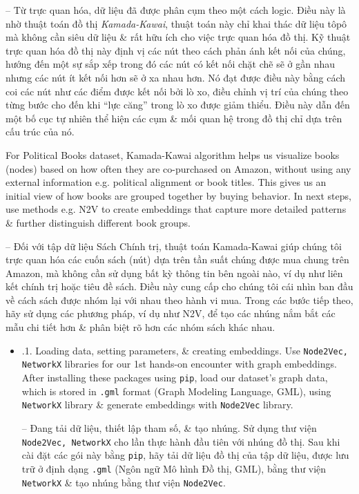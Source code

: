 \documentclass{article}
\begin{document}
\begin{itemize}
\begin{itemize}
        -- Từ trực quan hóa, dữ liệu đã được phân cụm theo một cách logic. Điều này là nhờ thuật toán đồ thị {\it Kamada-Kawai}, thuật toán này chỉ khai thác dữ liệu tôpô mà không cần siêu dữ liệu \& rất hữu ích cho việc trực quan hóa đồ thị. Kỹ thuật trực quan hóa đồ thị này định vị các nút theo cách phản ánh kết nối của chúng, hướng đến một sự sắp xếp trong đó các nút có kết nối chặt chẽ sẽ ở gần nhau nhưng các nút ít kết nối hơn sẽ ở xa nhau hơn. Nó đạt được điều này bằng cách coi các nút như các điểm được kết nối bởi lò xo, điều chỉnh vị trí của chúng theo từng bước cho đến khi ``lực căng'' trong lò xo được giảm thiểu. Điều này dẫn đến một bố cục tự nhiên thể hiện các cụm \& mối quan hệ trong đồ thị chỉ dựa trên cấu trúc của nó.

        For Political Books dataset, Kamada-Kawai algorithm helps us visualize books (nodes) based on how often they are co-purchased on Amazon, without using any external information e.g. political alignment or book titles. This gives us an initial view of how books are grouped together by buying behavior. In next steps, use methods e.g. N2V to create embeddings that capture more detailed patterns \& further distinguish different book groups.

        -- Đối với tập dữ liệu Sách Chính trị, thuật toán Kamada-Kawai giúp chúng tôi trực quan hóa các cuốn sách (nút) dựa trên tần suất chúng được mua chung trên Amazon, mà không cần sử dụng bất kỳ thông tin bên ngoài nào, ví dụ như liên kết chính trị hoặc tiêu đề sách. Điều này cung cấp cho chúng tôi cái nhìn ban đầu về cách sách được nhóm lại với nhau theo hành vi mua. Trong các bước tiếp theo, hãy sử dụng các phương pháp, ví dụ như N2V, để tạo các nhúng nắm bắt các mẫu chi tiết hơn \& phân biệt rõ hơn các nhóm sách khác nhau.
       \begin{itemize}
           \item {.1. Loading data, setting parameters, \& creating embeddings.} Use {\tt Node2Vec, NetworkX} libraries for our 1st hands-on encounter with graph embeddings. After installing these packages using {\tt pip}, load our dataset's graph data, which is stored in {\tt.gml} format (Graph Modeling Language, GML), using {\tt NetworkX} library \& generate embeddings with {\tt Node2Vec} library.

           -- {\sf Đang tải dữ liệu, thiết lập tham số, \& tạo nhúng.} Sử dụng thư viện {\tt Node2Vec, NetworkX} cho lần thực hành đầu tiên với nhúng đồ thị. Sau khi cài đặt các gói này bằng {\tt pip}, hãy tải dữ liệu đồ thị của tập dữ liệu, được lưu trữ ở định dạng {\tt.gml} (Ngôn ngữ Mô hình Đồ thị, GML), bằng thư viện {\tt NetworkX} \& tạo nhúng bằng thư viện {\tt Node2Vec}.


\end{itemize}
\end{itemize}
\end{itemize}
\end{document}
